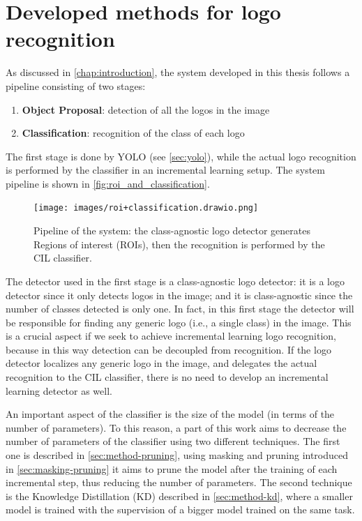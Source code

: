 \chapter{Developed methods for logo recognition}
\label{chap:methods}

As discussed in \autoref{chap:introduction}, the system developed in this thesis follows a pipeline consisting of two stages:
\begin{enumerate}
    \item \textbf{Object Proposal}: detection of all the logos in the image
    \item \textbf{Classification}: recognition of the class of each logo
\end{enumerate}
The first stage is done by YOLO (see \autoref{sec:yolo}), while the actual logo recognition is performed by the classifier in an incremental learning setup. The system pipeline is shown in \autoref{fig:roi_and_classification}.

\begin{figure}%
	\centering

    \begin{center}
        \texttt{[image: images/roi+classification.drawio.png]}
    \end{center}

	\caption{Pipeline of the system: the class-agnostic logo detector generates Regions of interest (ROIs), then the recognition is performed by the CIL classifier.}%
	\label{fig:roi_and_classification}%
\end{figure}

The detector used in the first stage is a class-agnostic logo detector: it is a logo detector since it only detects logos in the image; and it is class-agnostic since the number of classes detected is only one. In fact, in this first stage the detector will be responsible for finding any generic logo (i.e., a single class) in the image. This is a crucial aspect if we seek to achieve incremental learning logo recognition, because in this way detection can be decoupled from recognition. If the logo detector localizes any generic logo in the image, and delegates the actual recognition to the CIL classifier, there is no need to develop an incremental learning detector as well.

An important aspect of the classifier is the size of the model (in terms of the number of parameters). To this reason, a part of this work aims to decrease the number of parameters of the classifier using two different techniques. The first one is described in \autoref{sec:method-pruning}, using masking and pruning introduced in \autoref{sec:masking-pruning} it aims to prune the model after the training of each incremental step, thus reducing the number of parameters. The second technique is the Knowledge Distillation (KD) described in \autoref{sec:method-kd}, where a smaller model is trained with the supervision of a bigger model trained on the same task.

